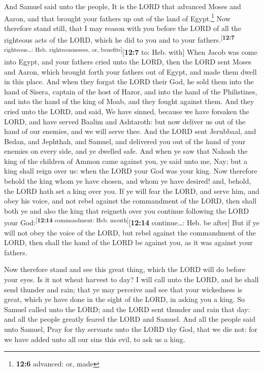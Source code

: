  And Samuel said unto the people, It is the LORD that
advanced Moses and Aaron, and that brought your fathers up out of the
land of Egypt.\footnote{\textbf{12:6} advanced: or, made} 
Now therefore stand still, that I may reason with you before the LORD of
all the righteous acts of the LORD, which he did to you and to your
fathers.\textsuperscript{{[}\textbf{12:7} righteous\ldots: Heb.
righteousnesses, or, benefits{]}}{[}\textbf{12:7} to: Heb. with{]}
 When Jacob was come into Egypt, and your fathers cried
unto the LORD, then the LORD sent Moses and Aaron, which brought forth
your fathers out of Egypt, and made them dwell in this place.
 And when they forgat the LORD their God, he sold them
into the hand of Sisera, captain of the host of Hazor, and into the hand
of the Philistines, and into the hand of the king of Moab, and they
fought against them.  And they cried unto the LORD, and
said, We have sinned, because we have forsaken the LORD, and have served
Baalim and Ashtaroth: but now deliver us out of the hand of our enemies,
and we will serve thee.  And the LORD sent Jerubbaal, and
Bedan, and Jephthah, and Samuel, and delivered you out of the hand of
your enemies on every side, and ye dwelled safe.  And
when ye saw that Nahash the king of the children of Ammon came against
you, ye said unto me, Nay; but a king shall reign over us: when the LORD
your God was your king.  Now therefore behold the king
whom ye have chosen, and whom ye have desired! and, behold, the LORD
hath set a king over you.  If ye will fear the LORD, and
serve him, and obey his voice, and not rebel against the commandment of
the LORD, then shall both ye and also the king that reigneth over you
continue following the LORD your God:\textsuperscript{{[}\textbf{12:14}
commandment: Heb. mouth{]}}{[}\textbf{12:14} continue\ldots: Heb. be
after{]}  But if ye will not obey the voice of the LORD,
but rebel against the commandment of the LORD, then shall the hand of
the LORD be against you, as it was against your fathers.

 Now therefore stand and see this great thing, which the
LORD will do before your eyes.  Is it not wheat harvest
to day? I will call unto the LORD, and he shall send thunder and rain;
that ye may perceive and see that your wickedness is great, which ye
have done in the sight of the LORD, in asking you a king.
 So Samuel called unto the LORD; and the LORD sent
thunder and rain that day: and all the people greatly feared the LORD
and Samuel.  And all the people said unto Samuel, Pray
for thy servants unto the LORD thy God, that we die not: for we have
added unto all our sins this evil, to ask us a king.

